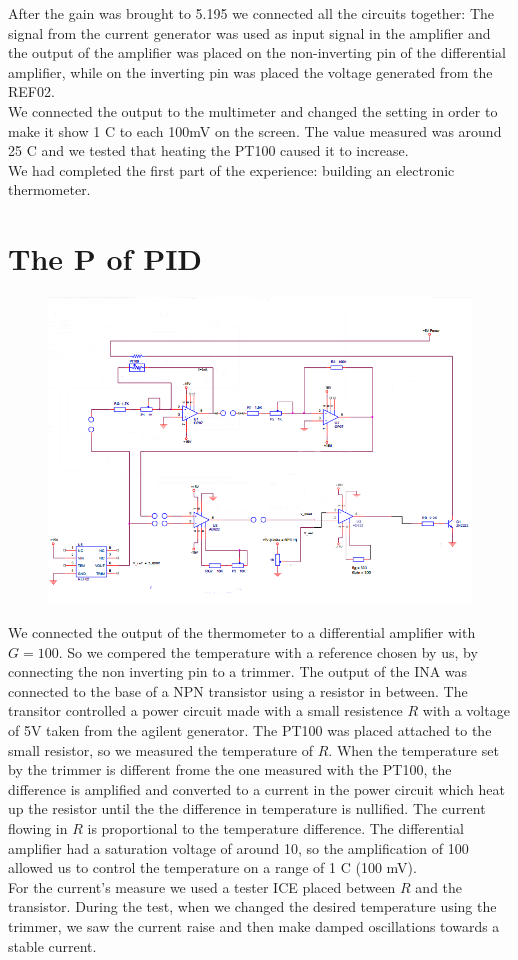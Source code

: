 After the gain was brought to 5.195 we connected all the circuits together: The signal from the current generator was used as input signal in the amplifier and the output of the amplifier was placed on the non-inverting pin of the differential amplifier, while on the inverting pin was placed the voltage generated from the REF02.\\
We connected the output to the multimeter and changed the setting in order to make it show 1 \degree C to each 100mV on the screen. The value measured was around 25 \degree C and we tested that heating the PT100 caused it to increase.\\
We had completed the first part of the experience: building an electronic thermometer.

\section{The P of PID}
\begin{figure}[H]
\centering
\includegraphics[width=.8\textwidth]{6/circuit2.png}
\end{figure}
We connected the output of the thermometer to a differential amplifier with $G=100$. So we compered the temperature with a reference chosen by us, by connecting the non inverting pin to a trimmer. The output of the INA was connected to the base of a NPN transistor using a resistor in between. The transitor controlled a power circuit made with a small resistence $R$ with a voltage of 5V taken from the agilent generator. The PT100 was placed attached to the small resistor, so we measured the temperature of $R$. When the temperature set by the trimmer is different frome the one measured with the PT100, the difference is amplified and converted to a current in the power circuit which heat up the resistor until the the difference in temperature is nullified. The current flowing in $R$ is proportional to the temperature difference. The differential amplifier had a saturation voltage of around 10, so the amplification of 100 allowed us to control the temperature on a range of 1 \degree C (100 mV).\\
For the current's measure we used a tester ICE placed between $R$ and the transistor. During the test, when we changed the desired temperature using the trimmer, we saw the current raise and then make damped oscillations towards a stable current.
